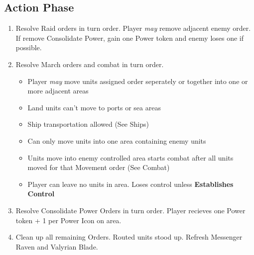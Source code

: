 \documentclass[12pt]{article}
\newenvironment{enumerateCustom}
{\begin{enumerate}
  \setlength{\itemsep}{1pt}
  \setlength{\parskip}{0pt}
  \setlength{\parsep}{0pt}}
{\end{enumerate}}
\newenvironment{itemizeCustom}
{\begin{itemize}
  \setlength{\itemsep}{1pt}
  \setlength{\parskip}{0pt}
  \setlength{\parsep}{0pt}}
{\end{itemize}}
\begin{document}
\begin{multicols*}{2}
\section*{Action Phase}
\begin{enumerateCustom}
	\item Resolve Raid orders in turn order. Player \emph{may} remove adjacent enemy order. If remove Consolidate Power, gain one Power token and enemy loses one if possible.
	\item Resolve March orders and combat in turn order. 
	\begin{itemizeCustom}
		\item Player \emph{may} move units assigned order seperately or together into one or more adjacent areas
		\item Land units can't move to ports or sea areas
		\item Ship transportation allowed (See Ships)
		\item Can only move units into one area containing enemy units
		\item Units move into enemy controlled area starts combat after all units moved for that Movement order (See Combat)
		\item Player can leave no units in area. Loses control unless \textbf{Establishes Control}
	\end{itemizeCustom}
	\item Resolve Consolidate Power Orders in turn order. Player recieves one Power token + 1 per Power Icon on area.
	\item Clean up all remaining Orders. Routed units stood up. Refresh Messenger Raven and Valyrian Blade.
\end{enumerateCustom}


\end{multicols*}
\end{document}

